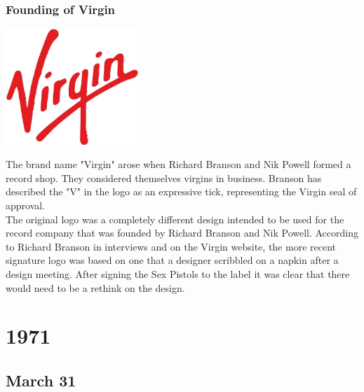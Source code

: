 \documentclass[11pt]{report}
\begin{document}
\subsection{Founding of Virgin}
\vspace{2mm}\begin{center}\includegraphics[width=5cm]{./img/virginLogo.jpg}\end{center}
The brand name "Virgin" arose when Richard Branson and Nik Powell formed a record shop. They considered themselves virgins in business. Branson has described the "V" in the logo as an expressive tick, representing the Virgin seal of approval.\\ \indent The original logo was a completely different design intended to be used for the record company that was founded by Richard Branson and Nik Powell. According to Richard Branson in interviews and on the Virgin website, the more recent signature logo was based on one that a designer scribbled on a napkin after a design meeting. After signing the Sex Pistols to the label it was clear that there would need to be a rethink on the design.

\chapter{1971}
\section{March 31}
\end{document}

